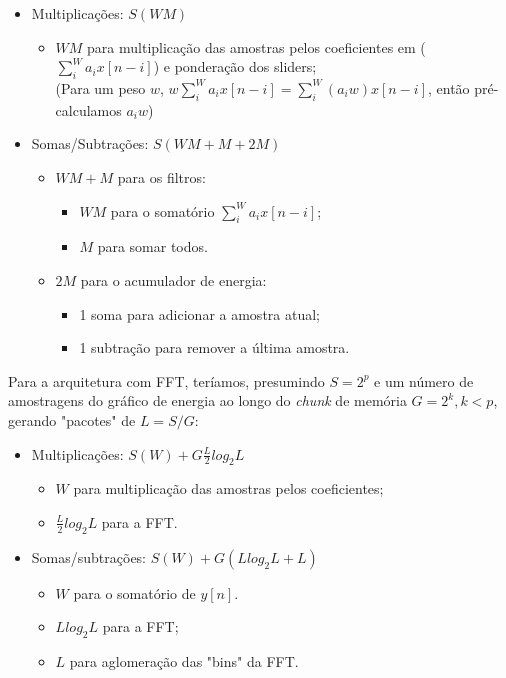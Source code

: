 \begin{itemize}
    \item Multiplicações: $S(WM)$
    \begin{itemize}
        \item $WM$ para multiplicação das amostras pelos coeficientes em ($\sum\limits_i^W a_ix[n-i]$) e ponderação dos sliders;\\
        (Para um peso $w$, $w\sum\limits_i^W a_ix[n-i]=\sum\limits_i^W (a_iw)x[n-i]$, então pré-calculamos $a_iw$)
    \end{itemize}
    \item Somas/Subtrações: $S(WM+M+2M)$
    \begin{itemize}
        \item $WM+M$ para os filtros:
        \begin{itemize}
            \item $WM$ para o somatório $\sum\limits_i^W a_ix[n-i]$;
            \item $M$ para somar todos.
        \end{itemize}
        \item $2M$ para o acumulador de energia:
        \begin{itemize}
            \item 1 soma para adicionar a amostra atual;
            \item 1 subtração para remover a última amostra.
        \end{itemize}
    \end{itemize}
\end{itemize}

Para a arquitetura com FFT, teríamos, presumindo $S=2^p$ e um número de amostragens do gráfico de energia ao longo do \textit{chunk} de memória $G=2^k,k<p$, gerando "pacotes" de $L=S/G$:

\begin{itemize}
    \item Multiplicações: $S(W) + G\frac{L}{2}log_2L$
    \begin{itemize}
        \item $W$ para multiplicação das amostras pelos coeficientes;
        \item $\frac{L}{2}log_2L$ para a FFT.
    \end{itemize}
    \item Somas/subtrações: $S(W)+G(Llog_2L+L)$
    \begin{itemize}
        \item $W$ para o somatório de $y[n]$.
        \item $Llog_2L$ para a FFT;
        \item $L$ para aglomeração das "bins" da FFT.
    \end{itemize}
\end{itemize}

